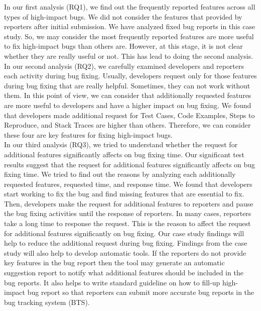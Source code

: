 \documentclass[conference]{IEEEtran}
\begin{document}
In our first analysis (RQ1), we find out the frequently reported features across all types of high-impact bugs. We did not consider the features that provided by reporters after initial submission. We have analyzed fixed bug reports in this case study. So, we may consider the most frequently reported features are more useful to fix high-impact bugs than others are. However, at this stage, it is not clear whether they are really useful or not. This has lead to doing the second analysis.\\

In our second analysis (RQ2), we carefully examined developers and reporters each activity during bug fixing. Usually, developers request only for those features during bug fixing that are really helpful. Sometimes, they can not work without them. In this point of view, we can consider that additionally requested features are more useful to developers and have a higher impact on bug fixing. We found that developers made additional request for Test Cases, Code Examples, Steps to Reproduce, and Stack Traces are higher than others. Therefore, we can consider these four are key features for fixing high-impact bugs.\\

In our third analysis (RQ3), we tried to understand whether the request for additional features significantly affects on bug fixing time. Our significant test results suggest that the request for additional features significantly affects on bug fixing time. We tried to find out the reasons by analyzing each additionally requested features, requested time, and response time. We found that developers start working to fix the bug and find missing features that are essential to fix. Then, developers  make the request for additional features to reporters and pause the bug fixing activities until the response of reporters. In many cases, reporters take a long time to response the request. This is the reason to affect the request for additional features significantly on bug fixing. Our case study findings will help to reduce the additional request during bug fixing. Findings from the case study will also help to develop automatic tools. If the reporters do not provide key features in the bug report then the tool may generate an automatic suggestion report to notify what additional features should be included in the bug reports. It also helps to write standard guideline on how to fill-up high-impact bug report so that reporters can submit more accurate bug reports in the bug tracking system (BTS). 
\end{document}
